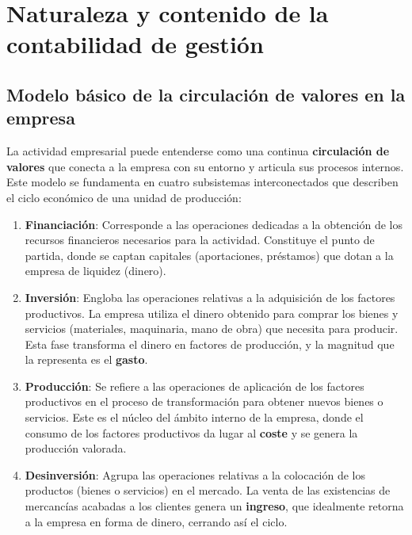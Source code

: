 
\chapter{Naturaleza y contenido de la contabilidad de gestión}

\section{Modelo básico de la circulación de valores en la empresa}

La actividad empresarial puede entenderse como una continua \textbf{circulación de valores} que conecta a la empresa con su entorno y articula sus procesos internos. Este modelo se fundamenta en cuatro subsistemas interconectados que describen el ciclo económico de una unidad de producción:
\begin{enumerate}
    \item \textbf{Financiación}: Corresponde a las operaciones dedicadas a la obtención de los recursos financieros necesarios para la actividad. Constituye el punto de partida, donde se captan capitales (aportaciones, préstamos) que dotan a la empresa de liquidez (dinero).
    \item \textbf{Inversión}: Engloba las operaciones relativas a la adquisición de los factores productivos. La empresa utiliza el dinero obtenido para comprar los bienes y servicios (materiales, maquinaria, mano de obra) que necesita para producir. Esta fase transforma el dinero en factores de producción, y la magnitud que la representa es el \textbf{gasto}.
    \item \textbf{Producción}: Se refiere a las operaciones de aplicación de los factores productivos en el proceso de transformación para obtener nuevos bienes o servicios. Este es el núcleo del ámbito interno de la empresa, donde el consumo de los factores productivos da lugar al \textbf{coste} y se genera la producción valorada.
    \item \textbf{Desinversión}: Agrupa las operaciones relativas a la colocación de los productos (bienes o servicios) en el mercado. La venta de las existencias de mercancías acabadas a los clientes genera un \textbf{ingreso}, que idealmente retorna a la empresa en forma de dinero, cerrando así el ciclo.
\end{enumerate}

